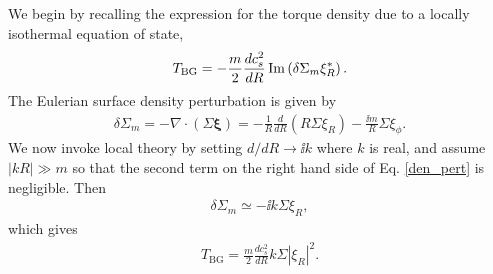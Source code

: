 We begin by recalling the expression for the torque density due to a
locally isothermal equation of state,
\begin{align*}
  T_\mathrm{BG} = - \frac{m}{2}\frac{dc_s^2}{dR}\operatorname{Im}\left(\delta\Sigma_m\xi_R^*\right).   
\end{align*}
The Eulerian surface density perturbation is given by
\begin{align}\label{den_pert}
  \delta\Sigma_m = -\nabla\cdot\left(\Sigma\bm{\xi}\right) 
  = -\frac{1}{R}\frac{d}{dR}\left(R\Sigma \xi_R\right) - \frac{\ii m}{R}\Sigma\xi_\phi.  
\end{align}
We now invoke local theory by setting $d/dR \to \ii k$ where $k$ is
real, and assume $|kR|\gg m$ so that the second term on the right hand
side of Eq. \ref{den_pert} is negligible. Then    
\begin{align}
  \delta\Sigma _m  \simeq -\ii k \Sigma \xi_R,
\end{align}
which gives
\begin{align}
  T_\mathrm{BG} = \frac{m}{2}\frac{dc_s^2}{dR}k\Sigma |\xi_R|^2. 
\end{align}
